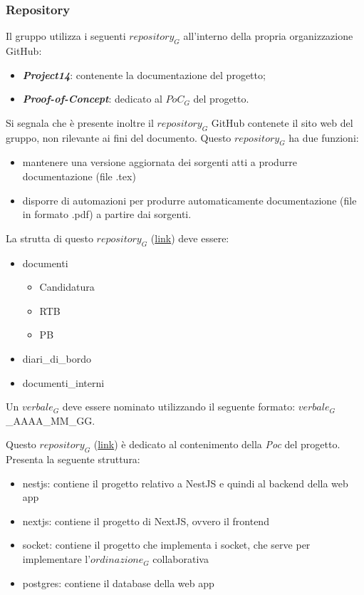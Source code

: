 \subsubsection{Repository}
Il gruppo utilizza i seguenti $\textit{repository}_G$ all'interno della propria organizzazione GitHub:
\begin{itemize}
    \item \emph{\textbf{Project14}}: contenente la documentazione del progetto;
    \item \emph{\textbf{Proof-of-Concept}}: dedicato al $\textit{PoC}_G$ del progetto.
\end{itemize}
Si segnala che è presente inoltre il $\textit{repository}_G$ GitHub contenete il sito web del gruppo, non rilevante ai fini del documento.
Questo $\textit{repository}_G$ ha due funzioni:
\begin{itemize}
    \item mantenere una versione aggiornata dei sorgenti atti a produrre documentazione (file .tex)
    \item disporre di automazioni per produrre automaticamente documentazione (file in formato .pdf) a partire dai sorgenti.
\end{itemize}
La strutta di questo $\textit{repository}_G$ (\href{https://github.com/RAMtastic6/Project14}{link}) deve essere:
\begin{itemize}
    \item documenti
    \begin{itemize}
        \item Candidatura
        \item RTB
        \item PB
    \end{itemize}
    \item diari\_di\_bordo
    \item documenti\_interni
\end{itemize}
Un $\textit{verbale}_G$ deve essere nominato utilizzando il seguente formato: $\textit{verbale}_G$\_AAAA\_MM\_GG.

Questo $\textit{repository}_G$ (\href{https://github.com/RAMtastic6/Proof-of-Concept}{link}) è dedicato al contenimento della \textit{Poc} del progetto. \\
Presenta la seguente struttura:
\begin{itemize}
    \item nestjs: contiene il progetto relativo a NestJS e quindi al backend della web app
    \item nextjs: contiene il progetto di NextJS, ovvero il frontend
    \item socket: contiene il progetto che implementa i socket, che serve per implementare l'$\textit{ordinazione}_G$ collaborativa
    \item postgres: contiene il database della web app
\end{itemize}


